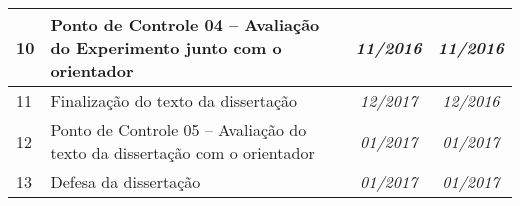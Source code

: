 \documentclass[10pt,a4paper]{report}
\begin{document}
\begin{table}[ht]
{\begin{tabular}{|l|l|c|c|}
			10 & Ponto de Controle 04 – Avaliação do Experimento junto com o orientador                & \textit{11/2016}                   & \textit{11/2016}                    \\ \hline
			11 & Finalização do texto da dissertação                                                   & \textit{12/2017}                   & \textit{12/2016}                    \\ \hline
			12 & Ponto de Controle 05 – Avaliação do texto da dissertação com o orientador             & \textit{01/2017}                   & \textit{01/2017}                    \\ \hline
			13 & Defesa da dissertação                                                                 & \textit{01/2017}                   & \textit{01/2017}                    \\ \hline
		\end{tabular}%
	}
\end{table}



\end{document}
